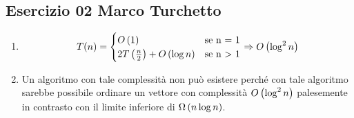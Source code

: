 
\subsection[02 MT]{Esercizio 02 Marco Turchetto}

\begin{enumerate}[label=\alph*)]
\item 
	
	
	\begin{equation*}
		T(n)=
		\begin{cases}
			O\left(1\right)										& \text{se n = 1} \\
			2T \left(\frac{n}{2} \right) + O\left(\log n\right)	& \text{se n > 1} \\
		\end{cases}
		\Rightarrow O\left(\log ^2 n\right)
	\end{equation*}
	
\item
	Un algoritmo con tale complessità non può esistere perché con tale algoritmo
	sarebbe possibile ordinare un vettore con complessità \( O\left(\log ^2 n\right) \)
	palesemente in contrasto con il limite inferiore di \( \Omega\left(n \log n\right) \).
\end{enumerate}